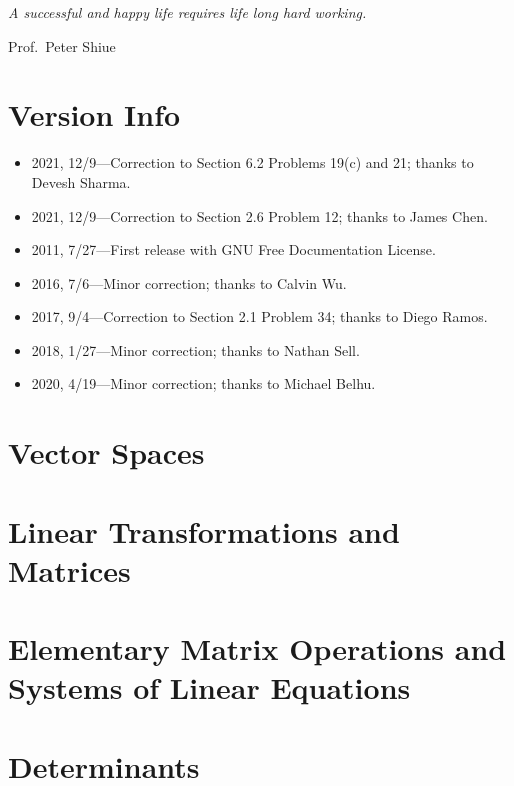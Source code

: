 \documentclass{report}
\theoremstyle{definition}
\begin{document}
\textit{A successful and happy life requires life long hard working.}
\begin{flushright}
Prof.~Peter Shiue
\end{flushright}

\chapter*{Version Info}
\begin{itemize}
\item 2021, 12/9---Correction to Section 6.2 Problems 19(c) and 21; thanks to Devesh Sharma.
\item 2021, 12/9---Correction to Section 2.6 Problem 12; thanks to James Chen.
\item 2011, 7/27---First release with GNU Free Documentation License.
\item 2016, 7/6---Minor correction; thanks to Calvin Wu.
\item 2017, 9/4---Correction to Section 2.1 Problem 34; thanks to Diego Ramos. 
\item 2018, 1/27---Minor correction; thanks to Nathan Sell.
\item 2020, 4/19---Minor correction; thanks to Michael Belhu.
\end{itemize}

\tableofcontents

\chapter{Vector Spaces}






 

\chapter{Linear Transformations and Matrices}








\chapter{Elementary Matrix Operations and Systems of Linear Equations}





\chapter{Determinants}




 
\end{document}
